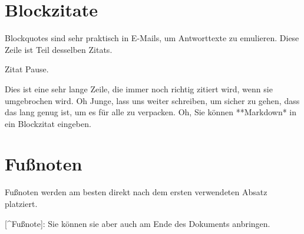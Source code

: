 \documentclass[12pt,de-CH,twoside,openright]{report}
\newenvironment{Shaded}{\begin{snugshade}}{\end{snugshade}}
\newcommand{\BaseNTok}[1]{\textcolor[rgb]{0.00,0.00,0.81}{#1}}
\newcommand{\NormalTok}[1]{#1}
\newcommand{\OtherTok}[1]{\textcolor[rgb]{0.56,0.35,0.01}{#1}}
\begin{document}
\begin{Shaded}
\end{Shaded}

\hypertarget{blockzitate}{%
\section{Blockzitate}\label{blockzitate}}

\begin{Shaded}
\begin{Highlighting}[]
\NormalTok{Blockquotes sind sehr praktisch in E-Mails, um Antworttexte zu emulieren.}
\NormalTok{Diese Zeile ist Teil desselben Zitats.}

\NormalTok{Zitat Pause.}

\NormalTok{Dies ist eine sehr lange Zeile, die immer noch richtig zitiert wird, wenn sie umgebrochen wird. Oh Junge, lass uns weiter schreiben, um sicher zu gehen, dass das lang genug ist, um es für alle zu verpacken. Oh, Sie können **Markdown* in ein Blockzitat eingeben.}
\end{Highlighting}
\end{Shaded}

\hypertarget{funoten}{%
\section{Fußnoten}\label{funoten}}

\begin{Shaded}
\begin{Highlighting}[]
\NormalTok{Fußnoten werden am besten direkt nach dem ersten verwendeten Absatz platziert.}

\OtherTok{[^Fußnote]}\NormalTok{: Sie können sie aber auch am Ende des Dokuments anbringen.}
\end{Highlighting}
\end{Shaded}
\end{document}
